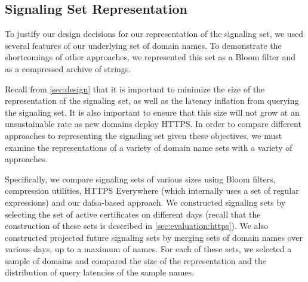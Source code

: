 \subsection{Signaling Set Representation}
\label{sec:evaluation:implementation}

To justify our design decisions for our representation of the signaling set, we
used several features of our underlying set of domain names. To demonstrate the
shortcomings of other approaches, we represented this set as a Bloom filter and
as a compressed archive of strings.

Recall from \autoref{sec:design} that it is important to minimize the
size of the representation of the signaling set, as well as the latency
inflation from querying the signaling set. It is also important to ensure that
this size will not grow at an unsustainable rate as new domains deploy HTTPS.
In order to compare different approaches to representing the signaling set given
these objectives, we must examine the representations of a variety of domain
name sets with a variety of approaches.

Specifically, we compare signaling sets of various sizes using Bloom filters,
compression utilities, HTTPS Everywhere (which internally uses a set of regular
expressions) and our \ac{dafsa}-based approach. We constructed signaling sets by
selecting the set of active certificates on different days (recall that the
construction of these sets is described in \autoref{sec:evaluation:https}). We
also constructed projected future signaling sets by merging sets of domain names
over various days, up to a maximum of  names. For each of these sets,
we selected a sample of  domains  and compared the size of the representation and the distribution
of query latencies of the sample names.



